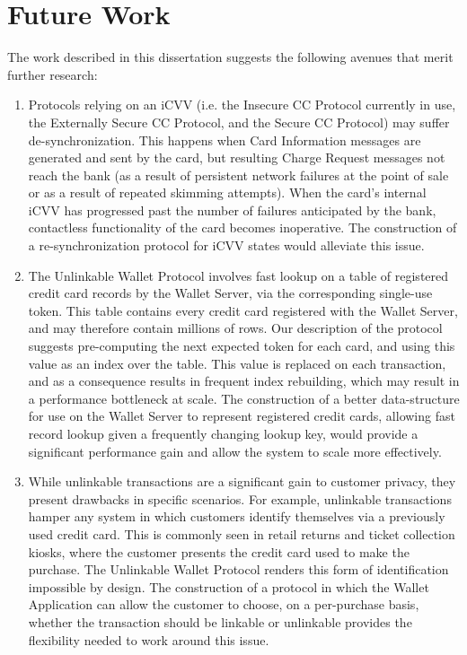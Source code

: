 \section{Future Work}

The work described in this dissertation suggests the following avenues that merit further research:

\begin{enumerate}
    \item Protocols relying on an iCVV (i.e. the Insecure CC Protocol currently in use, the Externally Secure CC Protocol, and the Secure CC Protocol) may suffer de-synchronization.
        This happens when Card Information messages are generated and sent by the card, but resulting Charge Request messages not reach the bank
            (as a result of persistent network failures at the point of sale or as a result of repeated skimming attempts).
        When the card's internal iCVV has progressed past the number of failures anticipated by the bank, contactless functionality of the card becomes inoperative.
        The construction of a re-synchronization protocol for iCVV states would alleviate this issue.

    \item The Unlinkable Wallet Protocol involves fast lookup on a table of registered credit card records by the Wallet Server, via the corresponding single-use token.
        This table contains every credit card registered with the Wallet Server, and may therefore contain millions of rows.
        Our description of the protocol suggests pre-computing the next expected token for each card, and using this value as an index over the table.
        This value is replaced on each transaction, and as a consequence results in frequent index rebuilding, which may result in a performance bottleneck at scale.
        The construction of a better data-structure for use on the Wallet Server to represent registered credit cards,
            allowing fast record lookup given a frequently changing lookup key, would provide a significant performance gain and allow the system to scale more effectively.

    \item While unlinkable transactions are a significant gain to customer privacy, they present drawbacks in specific scenarios.
        For example, unlinkable transactions hamper any system in which customers identify themselves via a previously used credit card.
        This is commonly seen in retail returns and ticket collection kiosks, where the customer presents the credit card used to make the purchase.
        The Unlinkable Wallet Protocol renders this form of identification impossible by design.
        The construction of a protocol in which the Wallet Application can allow the customer to choose, on a per-purchase basis,
            whether the transaction should be linkable or unlinkable provides the flexibility needed to work around this issue.
\end{enumerate}

